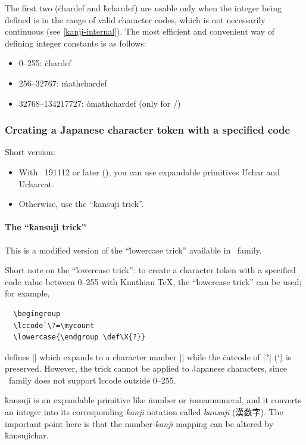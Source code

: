 \documentclass[a4paper,11pt,dvipdfmx]{article}
\def\Foreign#1{\textit{#1}}
\begin{document}
The first two (\.{chardef} and \.{kchardef}) are usable only when
the integer being defined is in the range of valid character codes,
which is not necessarily continuous (see \ref{kanji-internal}).
The most efficient and convenient way of defining integer constants
is as follows:
\begin{itemize}
 \item 0--255: \.{chardef}
 \item 256--32767: \.{mathchardef}
 \item 32768--134217727: \.{omathchardef} (only for \epTeX/\eupTeX)
\end{itemize}

\subsubsection{Creating a Japanese character token with a specified code}\label{jtoken-tricks}

Short version:
\begin{itemize}
 \item With \epTeX~191112 or later (),
   you can use expandable primitives \.{Uchar} and \.{Ucharcat}.
 \item Otherwise, use the ``\.{kansuji} trick''.
\end{itemize}

\paragraph{The ``\.{kansuji} trick''}
This is a modified version of the ``\.{lowercase} trick''
available in \pTeX\ family.

\begin{dangerous}
Short note on the ``\.{lowercase} trick'':
to create a character token with a specified code value between 0--255
with Knuthian \TeX, the ``\.{lowercase} trick'' can be used; for example,
\begin{verbatim}
  \begingroup
  \lccode`\?=\mycount
  \lowercase{\endgroup \def\X{?}}
\end{verbatim}
defines |\X| which expands to a character number |\mycount|
while the \.{catcode} of |?| (\the\catcode`\?) is preserved.
However, the trick cannot be applied to Japanese characters,
since \pTeX\ family does not support \.{lccode} outside 0--255.
\end{dangerous}

\.{kansuji} is an expandable primitive like \.{number} or \.{romannumeral},
and it converts an integer into its corresponding \Foreign{kanji} notation
called \Foreign{kansuji} (漢数字). The important point here is that
the number-\Foreign{kanji} mapping can be altered by \.{kansujichar}.
\end{document}
